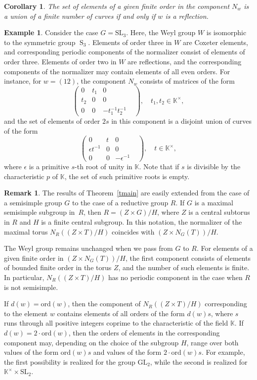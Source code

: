 \documentclass[a4paper,12pt]{amsart}
\theoremstyle{plain}
\newtheorem{corollary}{Corollary}
\theoremstyle{definition}
\newtheorem{remark}{Remark}
\newtheorem{example}{Example}
\newcommand{\KK}{\mathbb{K}}
\newcommand{\SL}{\mathrm{SL}}
\newcommand{\GL}{\mathrm{GL}}
\newcommand{\ord}{\mathrm{ord}}
\begin{document}
\begin{corollary}
The set of elements of a given finite order in the component $N_w$ is a union of a finite number of curves if and only if $w$ is a reflection.
\end{corollary}

\begin{example} \label{ex1}
Consider the case $G=\SL_3$. Here, the Weyl group $W$ is isomorphic to the symmetric group $\operatorname{S}_3$. Elements of order three in $W$ are Coxeter elements, and  corresponding periodic components of the normalizer consist of elements of order three. Elements of order two in $W$ are reflections, and the corresponding components of the normalizer may contain elements of all even orders. For instance, for $w=(12)$, the component $N_w$ consists of matrices of the form
$$
\begin{pmatrix}
0 & t_1 & 0 \\
t_2 & 0 & 0 & \\
0 & 0 & -t_1^{-1}t_2^{-1}
\end{pmatrix}, \quad t_1,t_2\in\KK^{\times},
$$
and the set of elements of order $2s$ in this component is a disjoint union of curves of the form
$$
\begin{pmatrix}
0 & t & 0 \\
\epsilon t^{-1} & 0 & 0 & \\
0 & 0 & -\epsilon^{-1}
\end{pmatrix}, \quad t\in\KK^{\times},
$$
where $\epsilon$ is a primitive $s$-th root of unity in $\KK$. Note that if $s$ is divisible by the characteristic $p$ of $\KK$, the set of such primitive roots is empty.
\end{example}

\begin{remark}
The results of Theorem~\ref{tmain} are easily extended from the case of a semisimple group $G$ to the case of a reductive group $R$. If $G$ is a maximal semisimple subgroup in~$R$, then $R=(Z\times G)/H$, where $Z$ is a central subtorus in $R$ and $H$ is a finite central subgroup.
In this notation, the normalizer of the maximal torus $N_R((Z\times T)/H)$ coincides with $(Z\times N_G(T))/H$.

The Weyl group remains unchanged when we pass from $G$ to $R$. For elements of a given finite order in $(Z\times N_G(T))/H$, the first component consists of elements of bounded finite order in the torus $Z$, and the number of such elements is finite. In particular, $N_R((Z\times T)/H)$ has no periodic component in the case when $R$ is not semisimple.

If $d(w)=\ord(w)$, then the component of $N_R((Z\times T)/H)$ corresponding to the element $w$ contains elements of all orders of the form $d(w)s$, where $s$ runs through all positive integers coprime to the characteristic of the field $\KK$. If $d(w)=2\cdot\ord(w)$, then the orders of elements in the corresponding component may, depending on the choice of the subgroup $H$, range over both values of the form $\ord(w)s$ and values of the form $2\cdot\ord(w)s$. For example, the first possibility is realized for the group $\GL_2$, while the second is realized for $\KK^{\times}\times\SL_2$.
\end{remark}
\end{document}
